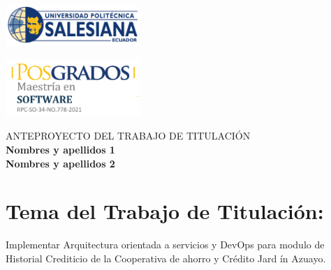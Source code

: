 \documentclass{article}
\begin{document}
\colorbox{white!10!}{
    \begin{minipage}[t]{0.05\textwidth} %
       \begin{flushright}
        \includegraphics[width=2in]{logo UPS.png}
       \end{flushright}
    \end{minipage}
    \begin{minipage}[H]{0.62 \textwidth} %
        \begin{center}
         
        \end{center}
     \end{minipage}
    \begin{minipage}[t]{0.05 \textwidth}
        \begin{flushleft}
        \hspace{10.25cm}
            \includegraphics[width=2in]{Posgrados.png}
        \end{flushleft}
    \end{minipage}
}

\vspace{0.1cm}
\begin{center}
{\large\textsc{ANTEPROYECTO DEL TRABAJO DE TITULACIÓN}} \\
\vspace{0.5cm}
{ \large \textbf{Nombres y apellidos 1}} \\ 
\vspace{0.25cm}
{ \large \textbf{Nombres y apellidos 2 }}
\end{center}
\vspace{0.1cm}

\section{Tema del Trabajo de Titulación:  }
\begin{center}
Implementar Arquitectura orientada a servicios y DevOps para modulo de Historial Crediticio de la Cooperativa de ahorro y Crédito Jard	ín Azuayo.
\end{center}
\end{document}
